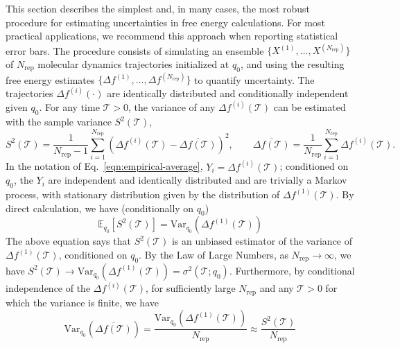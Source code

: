 This section describes the simplest and, in many cases, the most robust procedure for estimating uncertainties in free energy calculations. For most practical applications, we recommend this approach when reporting statistical error bars. The procedure consists of simulating an ensemble $\{X^{(1)},\ldots,X^{(N_{\mathrm{rep}})}\}$ of $N_{\mathrm{rep}}$ molecular dynamics trajectories initialized at $q_0$, and using the resulting free energy estimates $\{\Delta f^{(1)},\ldots,\Delta f^{(N_{\mathrm{rep}})}\}$ to quantify uncertainty. The trajectories $\Delta
f^{(i)} (\cdot)$ are identically distributed and conditionally independent given $q_0$. For any time $\mathcal{T} > 0$, the variance of any $\Delta f^{(i)} (\mathcal{T})$ can be estimated with the sample variance $S^2 (\mathcal{T})$,
\begin{equation}\label{eq:sample-variance-definition}
  S^2 (\mathcal{T}) = \frac{1}{N_{\mathrm{rep}} - 1} \sum_{i = 1}^{N_{\mathrm{rep}}} (\Delta f^{(i)} (\mathcal{T}) -
  \overline{\Delta f (\mathcal{T})})^2, \qquad \overline{\Delta f (\mathcal{T})} = \frac{1}{N_{\mathrm{rep}}}
  \sum_{i = 1}^{N_{\mathrm{rep}}} \Delta f^{(i)} (\mathcal{T}) .
\end{equation}
In the notation of Eq.~\ref{eqn:empirical-average}, $Y_i = \Delta f^{(i)}(\mathcal{T})$; conditioned on $q_0$, the $Y_i$ are independent and identically distributed and are trivially a Markov process, with stationary distribution given by the distribution of $\Delta f^{(1)}(\mathcal{T})$. By direct calculation, we have (conditionally on $q_0$)
\begin{equation}
    \mathbb{E}_{q_0}[S^2(\mathcal{T})] = \mathrm{Var}_{q_0}(\Delta f^{(1)}(\mathcal{T}))
\end{equation}
The above equation says that $S^2(\mathcal{T})$ is an unbiased estimator of the variance of $\Delta f^{(1)}(\mathcal{T})$, conditioned on $q_0$. By the Law of Large Numbers, as $N_{\mathrm{rep}} \rightarrow \infty$, we have $S^2 (\mathcal{T}) \rightarrow \mathrm{Var} _{q_0}(\Delta
f^{(1)} (\mathcal{T})) = \sigma^2 (\mathcal{T} ; q_0)$. Furthermore, by conditional independence of the $\Delta f^{(i)}(\mathcal{T})$, for sufficiently large $N_{\mathrm{rep}}$ and any $\mathcal{T}>0$ for which the variance is finite, we have
\begin{equation}\label{eqn:variance-of-empirical-mean}
\mathrm{Var}_{q_0}(\overline{\Delta f(\mathcal{T})}) = \frac{\mathrm{Var}_{q_0}(\Delta f^{(1)}(\mathcal{T}))}{N_{\mathrm{rep}}} \approx \frac{S^2(\mathcal{T})}{N_{\mathrm{rep}}}
\end{equation}
